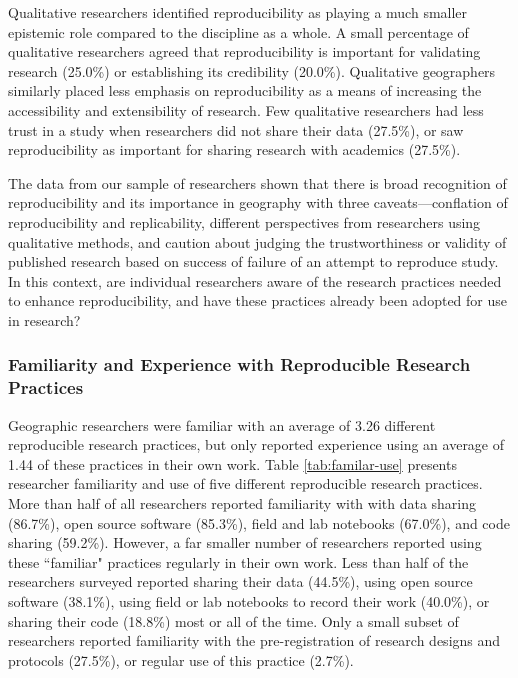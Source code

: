 \documentclass[]{interact}
\theoremstyle{plain}%
\theoremstyle{definition}
\theoremstyle{remark}
\begin{document}
Qualitative researchers identified reproducibility as playing a much smaller epistemic role compared to the discipline as a whole. 
A small percentage of qualitative researchers agreed that reproducibility is important for validating research (25.0\%) or establishing its credibility (20.0\%).
Qualitative geographers similarly placed less emphasis on reproducibility as a means of increasing the accessibility and extensibility of research.
Few qualitative researchers had less trust in a study when researchers did not share their data (27.5\%), or saw reproducibility as important for sharing research with academics (27.5\%).

The data from our sample of researchers shown that there is broad recognition of reproducibility and its importance in geography with three caveats---conflation of reproducibility and replicability, different perspectives from researchers using qualitative methods, and caution about judging the trustworthiness or validity of published research based on success of failure of an attempt to reproduce study. 
In this context, are individual researchers aware of the research practices needed to enhance reproducibility, and have these practices already been adopted for use in research?

\subsubsection*{Familiarity and Experience with Reproducible Research Practices}
Geographic researchers were familiar with an average of 3.26 different reproducible research practices, but only reported experience using an average of 1.44 of these practices in their own work.
Table \ref{tab:familar-use} presents researcher familiarity and use of five different reproducible research practices.
More than half of all researchers reported familiarity with with data sharing (86.7\%), open source software (85.3\%), field and lab notebooks (67.0\%), and code sharing (59.2\%).
However, a far smaller number of researchers reported using these ``familiar" practices regularly in their own work. 
Less than half of the researchers surveyed reported sharing their data (44.5\%), using open source software (38.1\%), using field or lab notebooks to record their work (40.0\%), or sharing their code (18.8\%) most or all of the time. 
Only a small subset of researchers reported familiarity with the pre-registration of research designs and protocols (27.5\%), or regular use of this practice (2.7\%).
\end{document}
